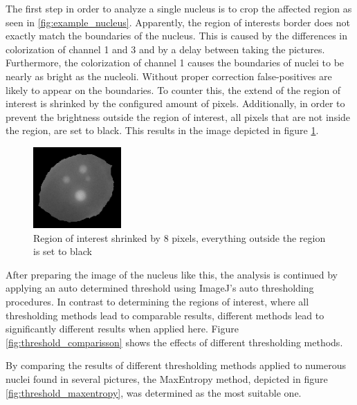 \documentclass[a4paper, 11pt]{article}
\begin{document}
The first step in order to analyze a single nucleus is to crop the affected
region as seen in \ref{fig:example_nucleus}. Apparently, the region of interests
border does not exactly match the boundaries of the nucleus. This is caused by
the differences in colorization of channel 1 and 3 and by a delay between taking
the pictures. Furthermore, the colorization of channel 1 causes the boundaries
of nuclei to be nearly as bright as the nucleoli. Without proper correction
false-positives are likely to appear on the boundaries. To counter this, the
extend of the region of interest is shrinked by the configured amount of pixels.
Additionally, in order to prevent the brightness outside the region of interest,
all pixels that are not inside the region, are set to black. This results in the
image depicted in figure \ref{fig:example_nucleus_shrinked_blacked}.

\begin{figure}
\vspace{-12pt}
\includegraphics[width=0.3\textwidth]{images/example_nucleus_shrinked8_blacked}
\caption{Region of interest shrinked by 8 pixels, everything outside the region
is set to black}
\label{fig:example_nucleus_shrinked_blacked}
\vspace{-12pt}
\end{figure}

After preparing the image of the nucleus like this, the analysis is continued by
applying an auto determined threshold using ImageJ's auto thresholding
procedures. In contrast to determining the regions of interest, where all
thresholding methods lead to comparable results, different methods lead to
significantly different results when applied here. Figure
\ref{fig:threshold_comparisson} shows the effects of different thresholding
methods.

By comparing the results of different thresholding methods applied to numerous
nuclei found in several pictures, the MaxEntropy method, depicted in figure
\ref{fig:threshold_maxentropy}, was determined as the most suitable one.
\end{document}
